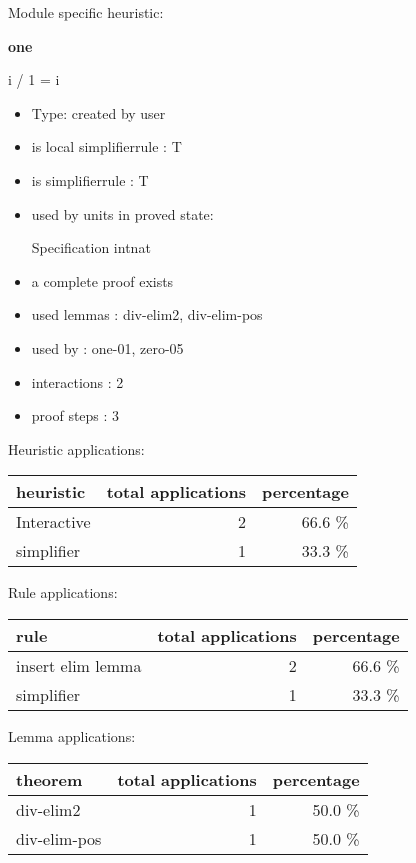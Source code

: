 \documentclass[a4paper]{article}
\begin{document}
Module specific heuristic:

\pagebreak

{\LARGE\bf one}\label{lemma-one}

\medskip

 \Fol i / 1 = i

\begin{itemize}

\item Type: created by user

\item is local simplifierrule : T
\item is simplifierrule : T
\item used by units in proved state:

Specification intnat
\item       a complete proof exists
\item       used lemmas  : div-elim2, div-elim-pos
\item       used by      : one-01, zero-05
\item       interactions : 2
\item       proof steps  : 3
\end{itemize}

\medskip


Heuristic applications:

\begin{supertabular}{l|r|r}
heuristic	& total applications & percentage \\ \hline
Interactive & 2 & 66.6 \% \\
simplifier & 1 & 33.3 \% \\

\end{supertabular}

Rule applications:

\begin{supertabular}{l|r|r}
rule	        & total applications & percentage \\ \hline
insert elim lemma & 2 & 66.6 \% \\
simplifier & 1 & 33.3 \% \\

\end{supertabular}

Lemma applications:

\begin{supertabular}{l|r|r}
theorem	        & total applications & percentage \\ \hline
div-elim2 & 1 & 50.0 \% \\
div-elim-pos & 1 & 50.0 \% \\

\end{supertabular}
\end{document}
